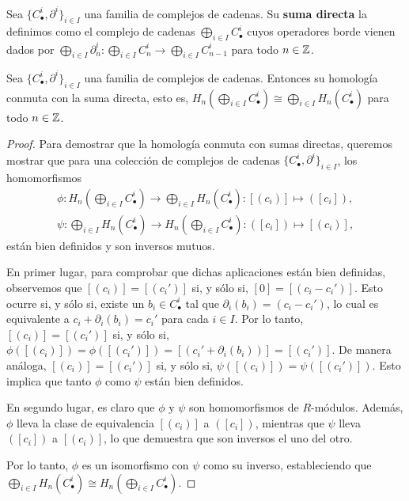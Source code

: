 \begin{definicion}
	Sea \(\{C_{\bullet}^{i}, \partial^{i}\}_{i \in I}\) una familia de complejos de cadenas.
	Su \textbf{suma directa} la definimos como el complejo de cadenas \(\bigoplus_{i
		\in I}C^{i}_{\bullet}\) cuyos operadores borde vienen dados por \(\bigoplus_{i
		\in I}{\partial}^{i}_{n} : \bigoplus_{i \in I}C^{i}_{n} \to \bigoplus_{i \in I}
	C^{i}_{n-1}\) para todo \(n \in \mathbb{Z}\).
\end{definicion}
\begin{proposicion}
	\label{prop:hom-free-commute} Sea \(\{C_{\bullet}^{i}, \partial^{i}\}_{i \in I}\)
	una familia de complejos de cadenas. Entonces su homología conmuta con la suma
	directa, esto es,
	\(H_{n}(\bigoplus_{i \in I}C_{\bullet}^{i}) \cong \bigoplus_{i \in I}H_{n}(C_{\bullet}
	^{i})\)
	para todo \(n \in \mathbb{Z}\).
\end{proposicion}
\begin{proof}
	Para demostrar que la homología conmuta con sumas directas, queremos mostrar
	que para una colección de complejos de cadenas
	\(\{C_{\bullet}^{i}, \partial^{i}\}_{i \in I}\), los homomorfismos
	\begin{align*}
		\phi: H_{n} \left( \bigoplus_{i \in I}C_{\bullet}^{i} \right) \rightarrow \bigoplus_{i \in I}H_{n} (C_{\bullet}^{i}) : [(c_{i})] \mapsto ([c_{i}]), \\
		\psi: \bigoplus_{i \in I}H_{n} (C_{\bullet}^{i}) \rightarrow H_{n} \left( \bigoplus_{i \in I}C_{\bullet}^{i} \right) : ([c_{i}]) \mapsto [(c_{i})],
	\end{align*}
	están bien definidos y son inversos mutuos.
	
	En primer lugar, para comprobar que dichas aplicaciones están bien definidas, observemos
	que \([(c_{i})] = [(c_{i}')]\) si, y sólo si, \([0] = [(c_{i} - c_{i}')]\). Esto
	ocurre si, y sólo si, existe un \(b_{i} \in C_{\bullet}^{i}\) tal que
	\(\partial_{i}(b_{i}) = (c_{i} - c_{i}')\), lo cual es equivalente a \(c_{i} + \partial
	_{i}(b_{i}) = c_{i}'\) para cada \(i \in I\). Por lo tanto, \([(c_{i})] = [(c_{i}')
	]\) si, y sólo si, \(\phi([(c_{i})]) = \phi([(c_{i}')]) = [(c_{i}' + \partial_{i}
	(b_{i}))] = [(c_{i}')]\). De manera análoga, \([(c_{i})] = [(c_{i}')]\) si, y
	sólo si, \(\psi([(c_{i})]) = \psi([(c_{i}')])\). Esto implica que tanto \(\phi\)
	como \(\psi\) están bien definidos.
	
	En segundo lugar, es claro que \(\phi\) y \(\psi\) son homomorfismos de \(R\)-módulos.
	Además, \(\phi\) lleva la clase de equivalencia \([(c_{i})]\) a \(([c_{i}])\),
	mientras que \(\psi\) lleva \(([c_{i}])\) a \([(c_{i})]\), lo que demuestra que son inversos
	el uno del otro.
	
	Por lo tanto, \(\phi\) es un isomorfismo con \(\psi\) como su inverso, estableciendo
	que \(\bigoplus_{i \in I}H_{n} (C_{\bullet}^{i}) \cong H_{n} \left( \bigoplus_{i
		\in I}C_{\bullet}^{i} \right)\).
\end{proof}
